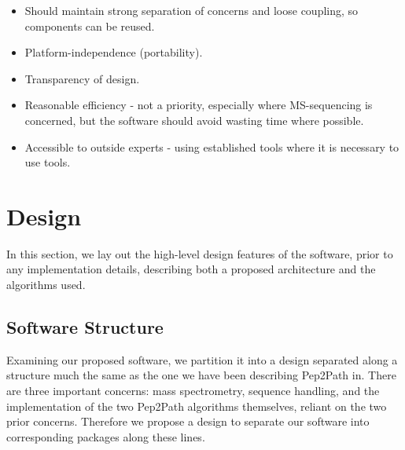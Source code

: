 \documentclass{l4proj}
\begin{document}
\begin{itemize}
\item Should maintain strong separation of concerns and loose coupling, so components can be reused.
\item Platform-independence (portability).
\item Transparency of design.
\item Reasonable efficiency - not a priority, especially where MS-sequencing is concerned, but the software should avoid wasting time where possible.
\item Accessible to outside experts - using established tools where it is necessary to use tools.
\end{itemize}

\chapter{Design}

In this section, we lay out the high-level design features of the software, prior to any implementation details, describing both a proposed architecture and the algorithms used.

\section{Software Structure}

Examining our proposed software, we partition it into a design separated along a structure much the same as the one we have been describing Pep2Path in. There are three important concerns: mass spectrometry, sequence handling, and the implementation of the two Pep2Path algorithms themselves, reliant on the two prior concerns. Therefore we propose a design to separate our software into corresponding packages along these lines. 
\end{document}
